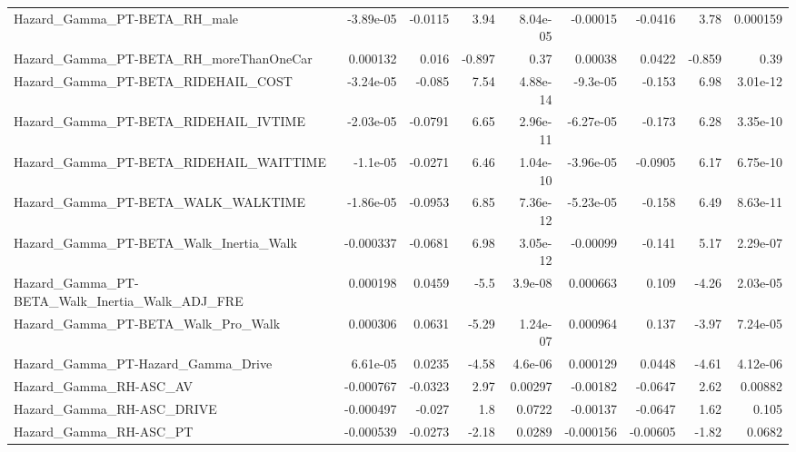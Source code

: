 \begin{tabular}{lrrrrrrrr}
Hazard\_Gamma\_PT-BETA\_RH\_male                       &   -3.89e-05 &      -0.0115 &     3.94 & 8.04e-05 &   -0.00015 &     -0.0416 &         3.78 &      0.000159 \\
Hazard\_Gamma\_PT-BETA\_RH\_moreThanOneCar             &    0.000132 &        0.016 &   -0.897 &     0.37 &    0.00038 &      0.0422 &       -0.859 &          0.39 \\
Hazard\_Gamma\_PT-BETA\_RIDEHAIL\_COST                 &   -3.24e-05 &       -0.085 &     7.54 & 4.88e-14 &   -9.3e-05 &      -0.153 &         6.98 &      3.01e-12 \\
Hazard\_Gamma\_PT-BETA\_RIDEHAIL\_IVTIME               &   -2.03e-05 &      -0.0791 &     6.65 & 2.96e-11 &  -6.27e-05 &      -0.173 &         6.28 &      3.35e-10 \\
Hazard\_Gamma\_PT-BETA\_RIDEHAIL\_WAITTIME             &    -1.1e-05 &      -0.0271 &     6.46 & 1.04e-10 &  -3.96e-05 &     -0.0905 &         6.17 &      6.75e-10 \\
Hazard\_Gamma\_PT-BETA\_WALK\_WALKTIME                 &   -1.86e-05 &      -0.0953 &     6.85 & 7.36e-12 &  -5.23e-05 &      -0.158 &         6.49 &      8.63e-11 \\
Hazard\_Gamma\_PT-BETA\_Walk\_Inertia\_Walk             &   -0.000337 &      -0.0681 &     6.98 & 3.05e-12 &   -0.00099 &      -0.141 &         5.17 &      2.29e-07 \\
Hazard\_Gamma\_PT-BETA\_Walk\_Inertia\_Walk\_ADJ\_FRE     &    0.000198 &       0.0459 &     -5.5 &  3.9e-08 &   0.000663 &       0.109 &        -4.26 &      2.03e-05 \\
Hazard\_Gamma\_PT-BETA\_Walk\_Pro\_Walk                 &    0.000306 &       0.0631 &    -5.29 & 1.24e-07 &   0.000964 &       0.137 &        -3.97 &      7.24e-05 \\
Hazard\_Gamma\_PT-Hazard\_Gamma\_Drive                 &    6.61e-05 &       0.0235 &    -4.58 &  4.6e-06 &   0.000129 &      0.0448 &        -4.61 &      4.12e-06 \\
Hazard\_Gamma\_RH-ASC\_AV                             &   -0.000767 &      -0.0323 &     2.97 &  0.00297 &   -0.00182 &     -0.0647 &         2.62 &       0.00882 \\
Hazard\_Gamma\_RH-ASC\_DRIVE                          &   -0.000497 &       -0.027 &      1.8 &   0.0722 &   -0.00137 &     -0.0647 &         1.62 &         0.105 \\
Hazard\_Gamma\_RH-ASC\_PT                             &   -0.000539 &      -0.0273 &    -2.18 &   0.0289 &  -0.000156 &    -0.00605 &        -1.82 &        0.0682 \\

\end{tabular}
